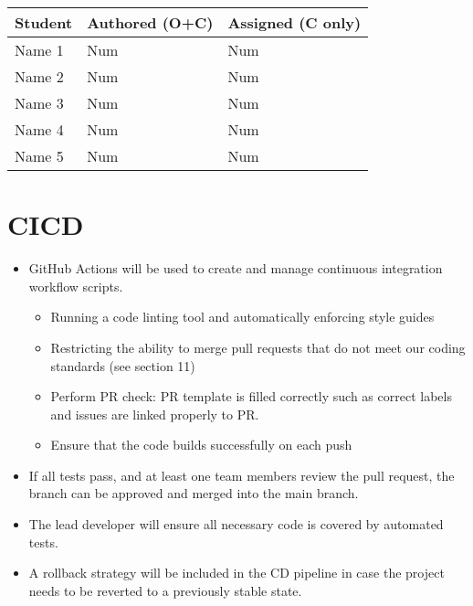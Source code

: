 \documentclass{article}
\begin{document}

\begin{table}[H]
\centering
\begin{tabular}{lll}
\toprule
\textbf{Student} & \textbf{Authored (O+C)} & \textbf{Assigned (C only)}\\
\midrule
Name 1 & Num & Num \\
Name 2 & Num & Num \\
Name 3 & Num & Num \\
Name 4 & Num & Num \\
Name 5 & Num & Num \\
\bottomrule
\end{tabular}
\end{table}


\section{CICD}
\begin{itemize}
	\item GitHub Actions will be used to create and manage continuous integration workflow scripts.
	\begin{itemize}
    \item Running a code linting tool and automatically enforcing style guides
    \item Restricting the ability to merge pull requests that do not meet our coding standards (see section 11)
    \item Perform PR check: PR template is filled correctly such as correct labels and issues are linked properly to PR. 
    \item Ensure that the code builds successfully on each push
  \end{itemize}
	\item If all tests pass, and at least one team members review the pull request, the branch can be approved and merged 
    into the main branch.
	\item The lead developer will ensure all necessary code is covered by automated tests.
	\item A rollback strategy will be included in the CD pipeline in case the project needs 
  to be reverted to a previously stable state.
\end{itemize}
\end{document}
